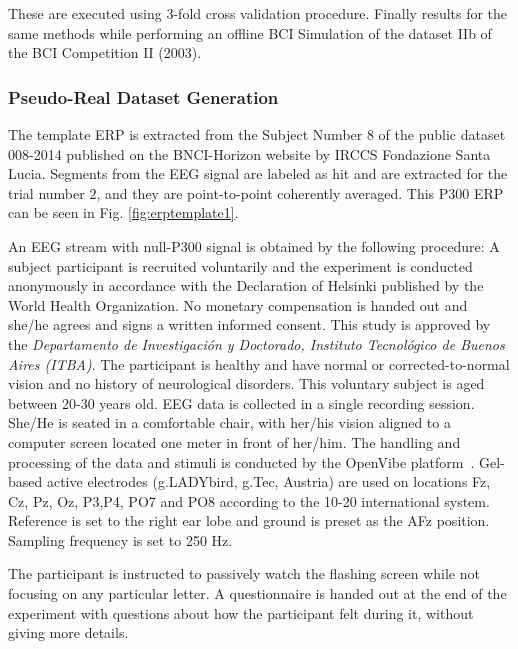 \documentclass[brainsci,article,submit,moreauthors,pdftex,10pt,a4paper]{mdpi}
\begin{document}
These are executed using 3-fold cross validation procedure. Finally results for the same methods while performing an offline BCI Simulation of the dataset  IIb of the BCI Competition II (2003).

\subsubsection{Pseudo-Real Dataset Generation}

The template ERP is extracted from the Subject Number $8$ of the public dataset 008-2014  \citep{Riccio2013} published on the BNCI-Horizon website \citep{Brunner2014} by IRCCS Fondazione Santa Lucia. Segments from the EEG signal are labeled as hit and are extracted for the trial number $2$, and they are point-to-point coherently averaged.  This P300 ERP can be seen in Fig.  \ref{fig:erptemplate1}. 

An EEG stream with null-P300 signal is obtained by the following procedure: 
A subject participant is recruited voluntarily and the experiment is conducted anonymously in accordance with the Declaration of Helsinki published by the World Health Organization.  No monetary compensation is handed out and she/he agrees and signs a written informed consent.  This study is approved by the \textit{Departamento de Investigación y Doctorado, Instituto Tecnológico de Buenos Aires (ITBA)}.  The participant is healthy and have normal or corrected-to-normal vision and no history of neurological disorders. This voluntary subject is aged between 20-30 years old.  EEG data is collected in a single recording session. She/He is seated in a comfortable chair, with her/his vision aligned to a computer screen located one meter in front of her/him.  The handling and processing of the data and stimuli is conducted by the OpenVibe platform~\citep{Renard2010}.  Gel-based active electrodes (g.LADYbird, g.Tec, Austria) are used on locations Fz, Cz, Pz, Oz, P3,P4, PO7 and PO8 according to the 10-20 international system.  Reference is set to the right ear lobe and ground is preset as the AFz position.   Sampling frequency is set to 250 Hz.

The participant is instructed to passively watch the flashing screen while not focusing on any particular letter.  A questionnaire is handed out at the end of the experiment with questions about how the participant felt during it, without giving more details.  

\end{document}
